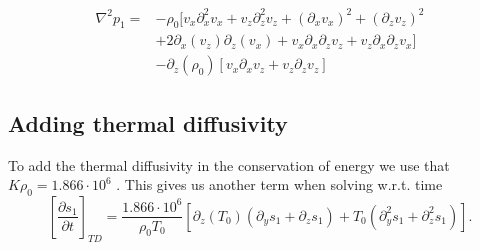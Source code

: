\begin{align*}
    \nabla^2 p_1 =&- \rho_0 [ v_x\partial_x^2 v_x + v_z\partial_z^2 v_z + \left( \partial_x v_x \right)^2 + \left( \partial_z v_z\right)^2\\
                   &+ 2\partial_x(v_z)\partial_z(v_x) + v_x\partial_x\partial_z v_z + v_z\partial_x\partial_z v_x]\\
                    &- \partial_z \left(\rho_0\right)\left[ v_x\partial_x v_z + v_z\partial_z v_z \right]
\end{align*}



\subsection{Adding thermal diffusivity}
To add the thermal diffusivity in the conservation of energy we use that $K\rho_0 = 1.866\cdot 10^6$ \citep{1999ApJS..121..247L}. This gives us another term when solving w.r.t. time
\begin{equation}
    \left[\frac{\partial s_1}{\partial t}\right]_{TD} = \frac{1.866\cdot 10^6}{\rho_0 T_0}\left[ \partial_z (T_0)(\partial_ys_1+\partial_zs_1)+T_0(\partial_y^2 s_1 + \partial_z^2 s_1)  \right].
\end{equation}

